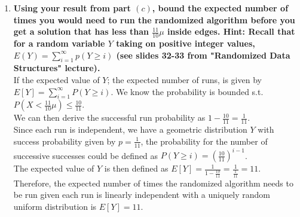 \documentclass{article}
\begin{document}
\begin{enumerate}
\begin{enumerate}
\newpage 
\item \textbf{Using your result from part $(c)$, bound the expected number of times you would need to run the randomized algorithm before you get a solution that has less than $\frac{11}{10}\mu$ inside edges. Hint: Recall that for a random variable $Y$  taking on positive integer values, $E(Y) = \sum_{i=1}^{\infty} p(Y \geq i)$ (see slides 32-33 from "Randomized Data Structures" lecture). } \\

If the expected value of $Y$; the expected number of runs, is given by $E[Y] = \sum_{i=1}^{\infty} P(Y \geq i)$. We know the probability is bounded s.t. $P(X < \frac{11}{10}\mu) \leq \frac{10}{11}$. \\
\newline 
We can then derive the successful run probability as $1 - \frac{10}{11} = \frac{1}{11}$. \\
\newline 
Since each run is independent, we have a geometric distribution $Y$ with success probability given by $p = \frac{1}{11}$, the probability for the number of successive successes could be defined as $P(Y \geq i) = (\frac{10}{11})^{i-1}$. \\
\newline 
The expected value of $Y$ is then defined as $E[Y] = \frac{1}{1-\frac{10}{11}} = \frac{1}{\frac{1}{11}} = 11$. Therefore, the expected number of times the randomized algorithm needs to be run given each run is linearly independent with a uniquely random uniform distribution is $E[Y] = 11$.

\end{enumerate}

\end{enumerate}
\end{document}
